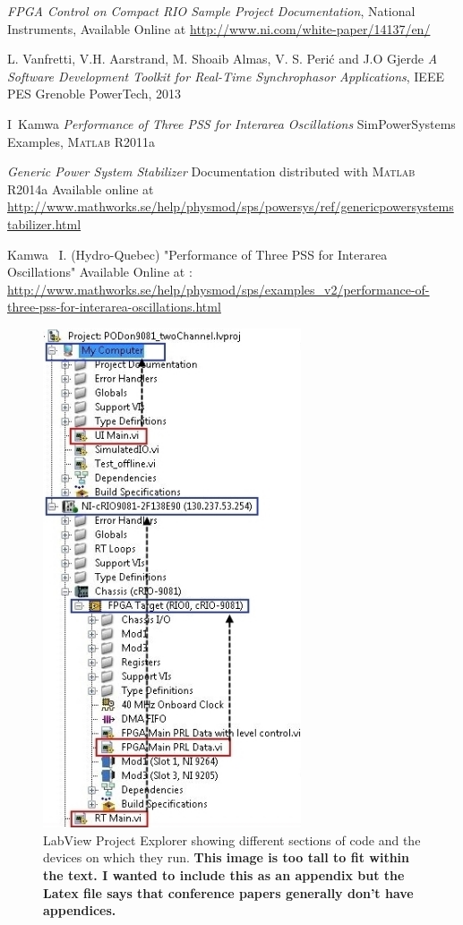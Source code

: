 \documentclass[conference]{IEEEtran}
\begin{document}
\begin{thebibliography}{1}
 \emph{FPGA Control on Compact RIO Sample Project Documentation}, National Instruments, Available Online at \url{http://www.ni.com/white-paper/14137/en/}

 L. Vanfretti, V.H. Aarstrand, M. Shoaib Almas, V. S. Peri\'c and J.O Gjerde \emph{A Software Development Toolkit for Real-Time Synchrophasor Applications},  IEEE PES Grenoble PowerTech, 2013

 I~Kamwa \emph{Performance of Three PSS for Interarea Oscillations} SimPowerSystems Examples, \textsc{Matlab} R2011a

 \emph{Generic Power System Stabilizer} Documentation distributed with \textsc{Matlab} R2014a Available online at \url{http://www.mathworks.se/help/physmod/sps/powersys/ref/genericpowersystemstabilizer.html}

 Kamwa \ I. (Hydro-Quebec) "Performance of Three PSS for Interarea Oscillations" Available Online at : \url{http://www.mathworks.se/help/physmod/sps/examples_v2/performance-of-three-pss-for-interarea-oscillations.html}

\begin{figure}[]
\centering
\includegraphics[width=3in]{LabVIEWProj.JPG}
\caption{LabView Project Explorer showing different sections of code and the devices on which they run. \textbf{This image is too tall to fit within the text. I wanted to include this as an appendix but the Latex file says that conference papers generally don't have appendices.
}}
\label{LabProject}
\end{figure}

\end{thebibliography}
\end{document}
